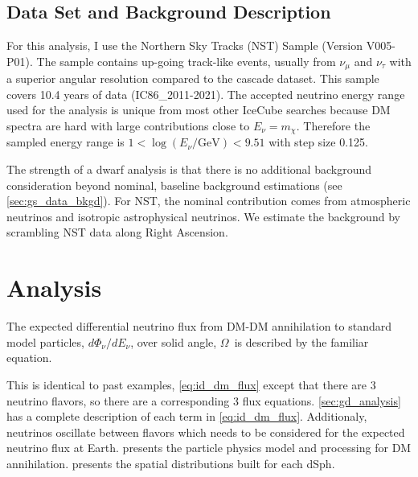 \subsection{Data Set and Background Description} \label{sec:icDM_data_bkgd}

For this analysis, I use the Northern Sky Tracks (NST) Sample (Version V005-P01).
The sample contains up-going track-like events, usually from $\nu_\mu$ and $\nu_\tau$ with a superior angular resolution compared to the cascade dataset.
This sample covers 10.4 years of data (IC86\_2011-2021).
The accepted neutrino energy range used for the analysis is unique from most other IceCube searches because DM spectra are hard with large contributions close to $E_\nu = m_\chi$.
Therefore the sampled energy range is $1 < \log(E_\nu /\textrm{GeV}) < 9.51$ with step size 0.125.

The strength of a dwarf analysis is that there is no additional background consideration beyond nominal, baseline background estimations (see \cref{sec:gs_data_bkgd}).
For NST, the nominal contribution comes from atmospheric neutrinos and isotropic astrophysical neutrinos.
We estimate the background by scrambling NST data along Right Ascension.

\section{Analysis}\label{sec:icDM_analysis}

The expected differential neutrino flux from DM-DM annihilation to standard model
particles, $d\Phi_{\nu}/dE_{\nu}$, over solid angle, $\Omega$~is described by the familiar equation.
\iddmannilation[\nu]

This is identical to past examples, \cref{eq:id_dm_flux} except that there are 3 neutrino flavors, so there are a corresponding 3 flux equations.
\cref{sec:gd_analysis} has a complete description of each term in \cref{eq:id_dm_flux}.
Additionaly, neutrinos oscillate between flavors which needs to be considered for the expected neutrino flux at Earth.
 presents the particle physics model and processing for DM annihilation.
 presents the spatial distributions built for each dSph.

